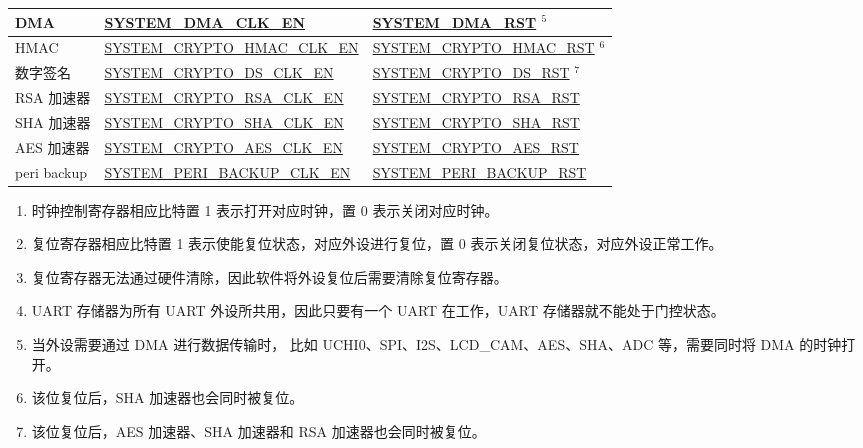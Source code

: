 \documentclass[main\_\_CN.tex]{subfiles}
\begin{document}
\begin{longtable}[c]{ |p{4cm}|p{6cm}|p{6cm}| }
DMA & \hyperref[fielddesc:SYSTEMDMACLKEN]{SYSTEM\_DMA\_CLK\_EN} & \hyperref[fielddesc:SYSTEMDMARST]{SYSTEM\_DMA\_RST} {\hyperref[other:sysreg-reset-notes]{$^5$}}  \\\hline
HMAC & \hyperref[fielddesc:SYSTEMCRYPTOHMACCLKEN]{SYSTEM\_CRYPTO\_HMAC\_CLK\_EN} & \hyperref[fielddesc:SYSTEMCRYPTOHMACRST]{SYSTEM\_CRYPTO\_HMAC\_RST} {\hyperref[other:sysreg-reset-notes]{$^6$}} \\\hline
数字签名 & \hyperref[fielddesc:SYSTEMCRYPTODSCLKEN]{SYSTEM\_CRYPTO\_DS\_CLK\_EN} & \hyperref[fielddesc:SYSTEMCRYPTODSRST]{SYSTEM\_CRYPTO\_DS\_RST} {\hyperref[other:sysreg-reset-notes]{$^7$}} \\\hline
RSA 加速器 & \hyperref[fielddesc:SYSTEMCRYPTORSACLKEN]{SYSTEM\_CRYPTO\_RSA\_CLK\_EN} & \hyperref[fielddesc:SYSTEMCRYPTORSARST]{SYSTEM\_CRYPTO\_RSA\_RST} \\\hline
SHA 加速器 & \hyperref[fielddesc:SYSTEMCRYPTOSHACLKEN]{SYSTEM\_CRYPTO\_SHA\_CLK\_EN} & \hyperref[fielddesc:SYSTEMCRYPTOSHARST]{SYSTEM\_CRYPTO\_SHA\_RST} \\\hline
AES 加速器 & \hyperref[fielddesc:SYSTEMCRYPTOAESCLKEN]{SYSTEM\_CRYPTO\_AES\_CLK\_EN} & \hyperref[fielddesc:SYSTEMCRYPTOAESRST]{SYSTEM\_CRYPTO\_AES\_RST} \\\hline
peri backup & \hyperref[fielddesc:SYSTEMPERIBACKUPCLKEN]{SYSTEM\_PERI\_BACKUP\_CLK\_EN} & \hyperref[fielddesc:SYSTEMPERIBACKUPRST]{SYSTEM\_PERI\_BACKUP\_RST} \\\hline

\end{longtable}


\begin{tiplisting}
\vspace{-3em}\label{other:sysreg-reset-notes}
\begin{enumerate}
    \item 时钟控制寄存器相应比特置 1 表示打开对应时钟，置 0 表示关闭对应时钟。
    \item 复位寄存器相应比特置 1 表示使能复位状态，对应外设进行复位，置 0 表示关闭复位状态，对应外设正常工作。
    \item 复位寄存器无法通过硬件清除，因此软件将外设复位后需要清除复位寄存器。
    \item UART 存储器为所有 UART 外设所共用，因此只要有一个 UART 在工作，UART 存储器就不能处于门控状态。
    \item 当外设需要通过 DMA 进行数据传输时， 比如 UCHI0、SPI、I2S、LCD\_CAM、AES、SHA、ADC 等，需要同时将 DMA 的时钟打开。
    \item 该位复位后，SHA 加速器也会同时被复位。
    \item 该位复位后，AES 加速器、SHA 加速器和 RSA 加速器也会同时被复位。
\end{enumerate}
\end{tiplisting}
\end{document}
